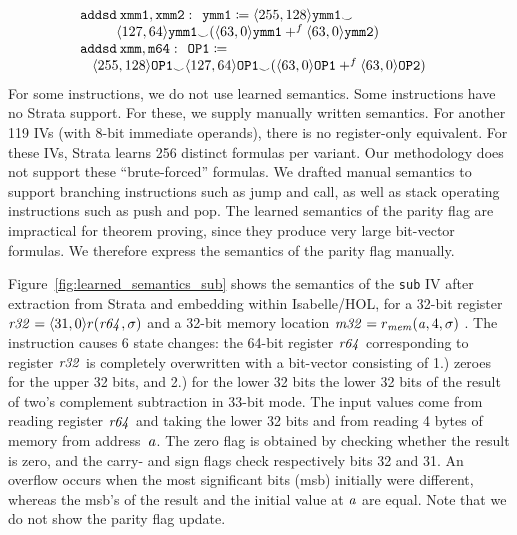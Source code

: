 \[
\begin{array}{llcl}
\mathtt{addsd\hspace{0.5ex} } \mathtt{xmm1, xmm2}: \hspace{1.0ex} \mathtt{ymm1} \coloneqq \langle 255,128\rangle \mathtt{ymm1} {_\smile}\\
	    \hspace{6ex} \langle 127,64\rangle \mathtt{ymm1} {_\smile} (\langle 63,0\rangle\mathtt{ymm1} +^f \langle 63,0\rangle \mathtt{ymm2}) &\\
\mathtt{addsd\hspace{0.5ex}} \mathtt{xmm,m64}: \hspace{1.0ex}\mathtt{OP1} \coloneqq\\
	    \hspace{2.0ex} \langle 255,128\rangle \mathtt{OP1} {_\smile} \langle 127,64\rangle \mathtt{OP1} {_\smile} (\langle 63,0\rangle\mathtt{OP1} +^f \langle 63,0\rangle \mathtt{OP2}) &
\end{array}
\]
For some instructions, we do not use learned semantics.
Some instructions have no Strata support.
For these, we supply manually written semantics.
For another 119 IVs (with 8-bit immediate operands), there is no register-only equivalent.
For these IVs, Strata learns 256 distinct formulas per variant.
Our methodology does not support these ``brute-forced'' formulas. 
We drafted manual semantics to support branching instructions such as jump and call, as well as stack operating instructions such as push and pop. 
The learned semantics of the parity flag are impractical for theorem proving, since they produce very large bit-vector formulas. We therefore express the semantics of the parity flag manually.

Figure~\ref{fig:learned_semantics_sub} shows the semantics of the \texttt{sub} IV after extraction from Strata and embedding within Isabelle/HOL, for a 32-bit register $\mathit{r32} = \langle 31,0\rangle r(\mathit{r64}, \sigma)$ and a 32-bit memory location $\mathit{m32} = r_{\mathit{mem}}(\mathit{a},4,\sigma)$ .
The instruction causes 6 state changes: the 64-bit register $\mathit{r64}$ corresponding to register $\mathit{r32}$ is completely overwritten with a bit-vector consisting of 1.) zeroes for the upper 32 bits, and 2.) for the lower 32 bits the lower 32 bits of the result of two's complement subtraction in 33-bit mode.
The input values come from reading register $\mathit{r64}$ and taking the lower 32 bits and from reading 4 bytes of memory from address~$\mathit{a}$.
The zero flag is obtained by checking whether the result is zero, and the carry- and sign flags check respectively bits 32 and 31.
An overflow occurs when the most significant bits (msb) initially were different, whereas the msb's of the result and the initial value at $\mathit{a}$ are equal.
Note that we do not show the parity flag update.

